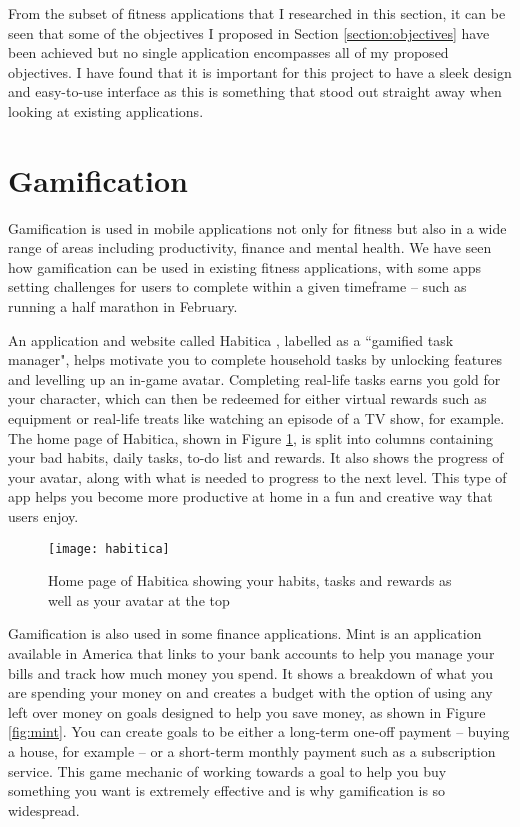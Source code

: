 From the subset of fitness applications that I researched in this section, it can be seen that some of the objectives I proposed in Section \ref{section:objectives} have been achieved but no single application encompasses all of my proposed objectives. I have found that it is important for this project to have a sleek design and easy-to-use interface as this is something that stood out straight away when looking at existing applications.


\section{Gamification}


Gamification is used in mobile applications not only for fitness but also in a wide range of areas including productivity, finance and mental health. We have seen how gamification can be used in existing fitness applications, with some apps setting challenges for users to complete within a given timeframe -- such as running a half marathon in February.

An application and website called Habitica \cite{Habitica}, labelled as a ``gamified task manager", helps motivate you to complete household tasks by unlocking features and levelling up an in-game avatar. Completing real-life tasks earns you gold for your character, which can then be redeemed for either virtual rewards such as equipment or real-life treats like watching an episode of a TV show, for example. The home page of Habitica, shown in Figure \ref{fig:habitica}, is split into columns containing your bad habits, daily tasks, to-do list and rewards. It also shows the progress of your avatar, along with what is needed to progress to the next level. This type of app helps you become more productive at home in a fun and creative way that users enjoy.

\begin{figure}[hbt]
  \texttt{[image: habitica]}
  \caption{Home page of Habitica showing your habits, tasks and rewards as well as your avatar at the top \cite{Habiticaa}}
  \label{fig:habitica}
\end{figure}


Gamification is also used in some finance applications. Mint \cite{IntuitInc.} is an application available in America that links to your bank accounts to help you manage your bills and track how much money you spend. It shows a breakdown of what you are spending your money on and creates a budget with the option of using any left over money on goals designed to help you save money, as shown in Figure \ref{fig:mint}. You can create goals to be either a long-term one-off payment -- buying a house, for example -- or a short-term monthly payment such as a subscription service. This game mechanic of working towards a goal to help you buy something you want is extremely effective and is why gamification is so widespread.

